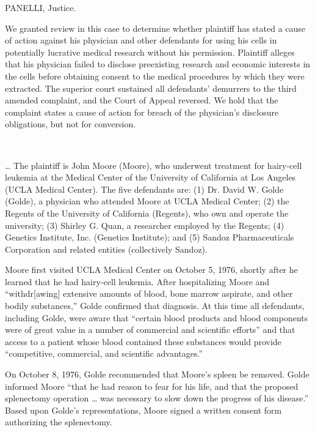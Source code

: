 

PANELLI, Justice.

We granted review in this case to determine whether plaintiff has stated a cause
of action against his physician and other defendants for using his cells in
potentially lucrative medical research without his permission. Plaintiff
alleges that his physician failed to disclose preexisting research and economic
interests in the cells before obtaining consent to the medical procedures by
which they were extracted. The superior court sustained all defendants'
demurrers to the third amended complaint, and the Court of Appeal reversed. We
hold that the complaint states a cause of action for breach of the physician's
disclosure obligations, but not for conversion.

~


{\dots} The plaintiff is John Moore (Moore), who underwent treatment for
hairy-cell leukemia at the Medical Center of the University of California at
Los Angeles (UCLA Medical Center). The five defendants are: (1) Dr. David W.
Golde (Golde), a physician who attended Moore at UCLA Medical Center; (2) the
Regents of the University of California (Regents), who own and operate the
university; (3) Shirley G. Quan, a researcher employed by the Regents; (4)
Genetics Institute, Inc. (Genetics Institute); and (5) Sandoz Pharmaceuticals
Corporation and related entities (collectively Sandoz).

Moore first visited UCLA Medical Center on October 5, 1976, shortly after he
learned that he had hairy-cell leukemia. After hospitalizing Moore and
``withdr[awing] extensive amounts of blood, bone marrow aspirate, and other
bodily substances,'' Golde confirmed that diagnosis. At this time all
defendants, including Golde, were aware that ``certain blood products and blood
components were of great value in a number of commercial and scientific
efforts'' and that access to a patient whose blood contained these substances
would provide ``competitive, commercial, and scientific advantages.''

On October 8, 1976, Golde recommended that Moore's spleen be removed. Golde
informed Moore ``that he had reason to fear for his life, and that the proposed
splenectomy operation  {\dots}  was necessary to slow down the progress of his
disease.'' Based upon Golde's representations, Moore signed a written consent
form authorizing the splenectomy.

